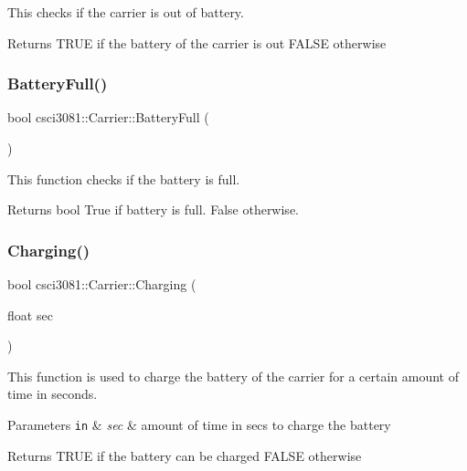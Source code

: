 This checks if the carrier is out of battery. 

\begin{DoxyReturn}{Returns}
T\+R\+UE if the battery of the carrier is out F\+A\+L\+SE otherwise 
\end{DoxyReturn}
\mbox{\label{classcsci3081_1_1Carrier_aaeb0a45df6b9fa522e04681da272cb6f}} 
\subsubsection{\texorpdfstring{Battery\+Full()}{BatteryFull()}}
{\footnotesize\ttfamily bool csci3081\+::\+Carrier\+::\+Battery\+Full (\begin{DoxyParamCaption}{ }\end{DoxyParamCaption})}



This function checks if the battery is full. 

\begin{DoxyReturn}{Returns}
bool True if battery is full. False otherwise. 
\end{DoxyReturn}
\mbox{\label{classcsci3081_1_1Carrier_aa004703e60b8ffed9661ee204f619983}} 
\subsubsection{\texorpdfstring{Charging()}{Charging()}}
{\footnotesize\ttfamily bool csci3081\+::\+Carrier\+::\+Charging (\begin{DoxyParamCaption}\item[{float}]{sec }\end{DoxyParamCaption})}



This function is used to charge the battery of the carrier for a certain amount of time in seconds. 


\begin{DoxyParams}[1]{Parameters}
\mbox{\tt in}  & {\em sec} & amount of time in secs to charge the battery \\
\hline
\end{DoxyParams}
\begin{DoxyReturn}{Returns}
T\+R\+UE if the battery can be charged F\+A\+L\+SE otherwise 
\end{DoxyReturn}
\mbox{\label{classcsci3081_1_1Carrier_a6fa3861b1b7acb89827e768308196cc1}} 
